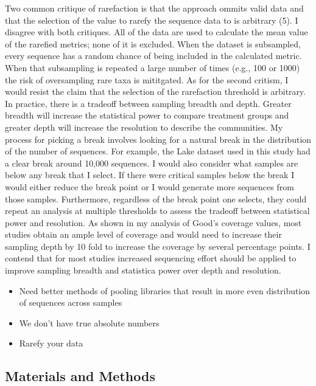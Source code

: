 \documentclass[
]{article}
\providecommand{\tightlist}{%
  \setlength{\itemsep}{0pt}\setlength{\parskip}{0pt}}
\begin{document}
Two common critique of rarefaction is that the approach ommits valid
data and that the selection of the value to rarefy the sequence data to
is arbitrary (5). I disagree with both critiques. All of the data are
used to calculate the mean value of the rarefied metrics; none of it is
excluded. When the dataset is subsampled, every sequence has a random
chance of being included in the calculated metric. When that subsampling
is repeated a large number of times (e.g., 100 or 1000) the risk of
oversampling rare taxa is mititgated. As for the second critism, I would
resist the claim that the selection of the rarefaction threshold is
arbitrary. In practice, there is a tradeoff between sampling breadth and
depth. Greater breadth will increase the statistical power to compare
treatment groups and greater depth will increase the resolution to
describe the communities. My process for picking a break involves
looking for a natural break in the distribution of the number of
sequences. For example, the Lake dataset used in this study had a clear
break around 10,000 sequences. I would also consider what samples are
below any break that I select. If there were critical samples below the
break I would either reduce the break point or I would generate more
sequences from those samples. Furthermore, regardless of the break point
one selects, they could repeat an analysis at multiple thresholds to
assess the tradeoff between statistical power and resolution. As shown
in my analysis of Good's coverage values, most studies obtain an ample
level of coverage and would need to increase their sampling depth by 10
fold to increase the coverage by several percentage points. I contend
that for most studies increased sequencing effort should be applied to
improve sampling breadth and statistica power over depth and resolution.

\begin{itemize}
\tightlist
\item
  Need better methods of pooling libraries that result in more even
  distribution of sequences across samples
\item
  We don't have true absolute numbers
\item
  Rarefy your data
\end{itemize}

\hypertarget{materials-and-methods}{%
\subsection{Materials and Methods}\label{materials-and-methods}}
\end{document}
